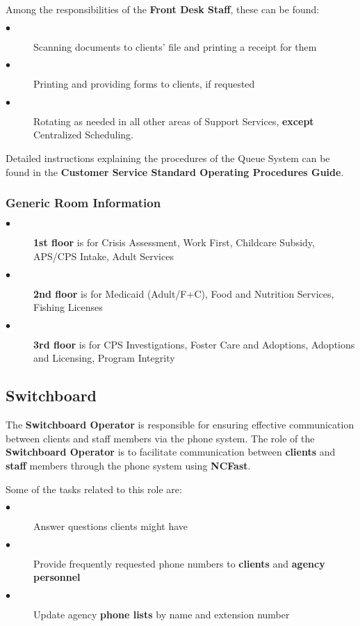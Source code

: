 \documentclass{article}
\begin{document}
Among the responsibilities of the \textbf{Front Desk Staff}, these can be found:

\begin{description}
    \item[$\bullet$] Scanning documents to clients' file and printing a receipt for them
    \item[$\bullet$] Printing and providing forms to clients, if requested
    \item[$\bullet$] Rotating as needed in all other areas of Support Services, \textbf{except} Centralized Scheduling.
\end{description}

Detailed instructions explaining the procedures of the Queue System can be found in the \textbf{Customer Service Standard Operating Procedures Guide}.

\subsubsection{Generic Room Information}
\begin{description}
    \item[$\bullet$] \textbf{1st floor} is for Crisis Assessment, Work First, Childcare Subsidy, APS/CPS Intake, Adult Services
    \item[$\bullet$] \textbf{2nd floor} is for Medicaid (Adult/F+C), Food and Nutrition Services, Fishing Licenses
    \item[$\bullet$] \textbf{3rd floor} is for CPS Investigations, Foster Care and Adoptions, Adoptions and Licensing, Program Integrity
\end{description}

\subsection{Switchboard}
The \textbf{Switchboard Operator} is responsible for ensuring effective communication between clients and staff members via the phone system. The role of the \textbf{Switchboard Operator} is to facilitate communication between \textbf{clients} and \textbf{staff} members through the phone system using \textbf{NCFast}.

Some of the tasks related to this role are:

\begin{description}
    \item[$\bullet$] Answer questions clients might have
    \item[$\bullet$] Provide frequently requested phone numbers to \textbf{clients} and \textbf{agency personnel}
    \item[$\bullet$] Update agency \textbf{phone lists} by name and extension number
\end{description}
\end{document}
